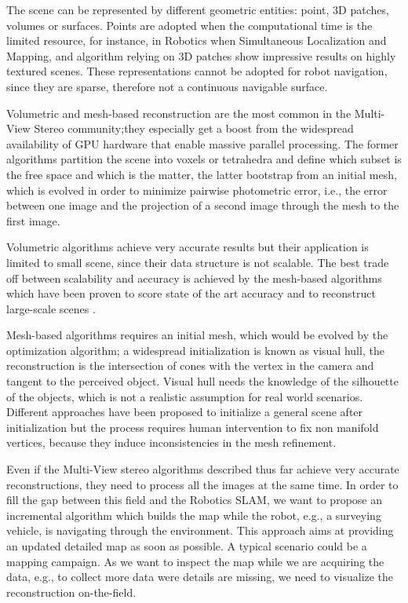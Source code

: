 The scene can be represented by different geometric entities: point, 3D patches, volumes or surfaces.
Points are adopted when the computational time is the limited resource, for instance, in Robotics when Simultaneous Localization and Mapping, and algorithm relying on 3D patches show impressive results on highly textured scenes. 
These representations cannot be adopted for robot navigation, since they are sparse, therefore not a continuous navigable surface.

Volumetric and mesh-based reconstruction are the most common in the Multi-View Stereo community;they especially get a boost from the widespread availability of GPU hardware that enable massive parallel processing.
The former algorithms partition the scene into voxels or tetrahedra and define which subset is the free space and which is the matter, the latter bootstrap from an initial mesh, which is evolved in order to minimize pairwise photometric error, i.e., the error between one image and the projection of a second image through the mesh to the first image.

Volumetric algorithms achieve very accurate results but their application is limited to small scene, since their data structure is not scalable. 
The best trade off between scalability and accuracy is achieved by the mesh-based algorithms which have been proven to score state of the art accuracy \cite{li2015detail} and to reconstruct large-scale scenes \cite{vu_et_al_2012}.


Mesh-based algorithms requires an initial mesh, which would be evolved by the optimization algorithm; a widespread initialization is known as visual hull, the reconstruction is the intersection of cones with the vertex in the camera and tangent to the perceived object.
Visual hull needs the knowledge of the silhouette of the objects, which is not a realistic assumption for real world scenarios.
Different approaches have been proposed to initialize a general scene after initialization but the process requires human intervention to fix non manifold vertices, because they induce inconsistencies in the mesh refinement.

Even if the Multi-View stereo algorithms described thus far achieve very accurate reconstructions, they need to process all the images at the same time. 
In order to fill the gap between this field and the Robotics SLAM, we want to propose an incremental algorithm which builds the map while the robot, e.g., a surveying vehicle, is navigating through the environment. 
This approach aims at providing an updated detailed map as soon as possible.
A typical scenario could be a mapping campaign.
As we want to inspect the map while we are acquiring the data, e.g., to collect more data were details are missing, we need to visualize the reconstruction on-the-field. 


